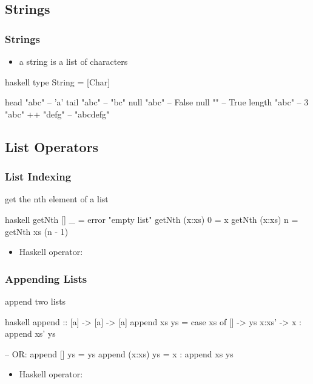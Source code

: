 \documentclass[dvipsnames]{beamer}
\theoremstyle{plain}
\begin{document}
\subsection{Strings}

\begin{frame}[fragile]
  \frametitle{Strings}

  \begin{itemize}
    \item a string is a list of characters
  \end{itemize}

  \begin{exampleblock}{}
    \begin{pygments}{haskell}
type String = [Char]

head "abc"              -- 'a'
tail "abc"              -- "bc"
null "abc"              -- False
null ""                 -- True
length "abc"            -- 3
"abc" ++ "defg"         -- "abcdefg"
    \end{pygments}
  \end{exampleblock}
\end{frame}

\subsection{List Operators}

\begin{frame}[fragile]
  \frametitle{List Indexing}

  \begin{exampleblock}{get the nth element of a list}
    \begin{pygments}{haskell}
getNth [] _ = error "empty list"
getNth (x:xs) 0 = x
getNth (x:xs) n = getNth xs (n - 1)
    \end{pygments}
  \end{exampleblock}

  \pause
  \begin{itemize}
    \item Haskell operator: 
  \end{itemize}
\end{frame}

\begin{frame}[fragile]
  \frametitle{Appending Lists}

  \begin{exampleblock}{append two lists}
    \begin{pygments}{haskell}
append :: [a] -> [a] -> [a]
append xs ys =
    case xs of
      [] -> ys
      x:xs' -> x : append xs' ys

-- OR:
append [] ys = ys
append (x:xs) ys = x : append xs ys
    \end{pygments}
  \end{exampleblock}

  \pause
  \begin{itemize}
    \item Haskell operator: 
  \end{itemize}
\end{frame}
\end{document}
